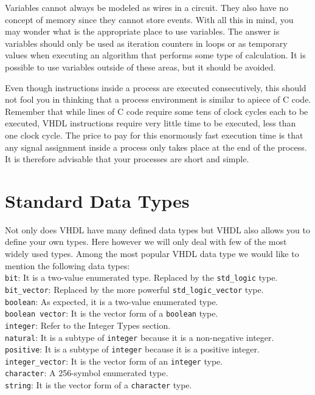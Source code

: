 Variables cannot always be modeled as wires in a circuit. They also have no concept of memory since they cannot store events. With all this in mind, you may wonder what is the appropriate place to use variables. The answer is variables should only be used as iteration counters in loops or as temporary values when executing an algorithm that performs some type of calculation. It is possible to use variables outside of these areas, but it should be avoided.

Even though instructions inside a process are executed consecutively, this should not fool you in thinking that a process environment is similar to apiece of C code. Remember that while lines of C code require some tens of clock cycles each to be executed, VHDL instructions require very little time to be executed, less than one clock cycle. The price to pay for this enormously fast execution time is that any signal assignment inside a process only takes place at the end of the process. It is therefore advisable that your processes are short and simple.

\section{Standard Data Types}
Not only does VHDL have many defined data types but VHDL also allows you to define your own types. Here however we will only deal with few of the most widely used types. Among the most popular VHDL data type we would like to mention the following data types:\\

\noindent
\texttt{bit}: It is a two-value enumerated type. Replaced by the \texttt{std\_logic} type.\\
\texttt{bit\_vector}: Replaced by the more powerful \texttt{std\_logic\_vector} type.\\
\texttt{boolean}: As expected, it is a two-value enumerated type.\\
\texttt{boolean vector}: It is the vector form of a \texttt{boolean} type.\\
\texttt{integer}: Refer to the Integer Types section.\\
\texttt{natural}: It is a subtype of \texttt{integer} because it is a non-negative integer.\\
\texttt{positive}: It is a subtype of \texttt{integer} because it is a positive integer.\\
\texttt{integer\_vector}: It is the vector form of an \texttt{integer} type.\\
\texttt{character}: A 256-symbol enumerated type.\\
\texttt{string}: It is the vector form of a \texttt{character} type.\\

